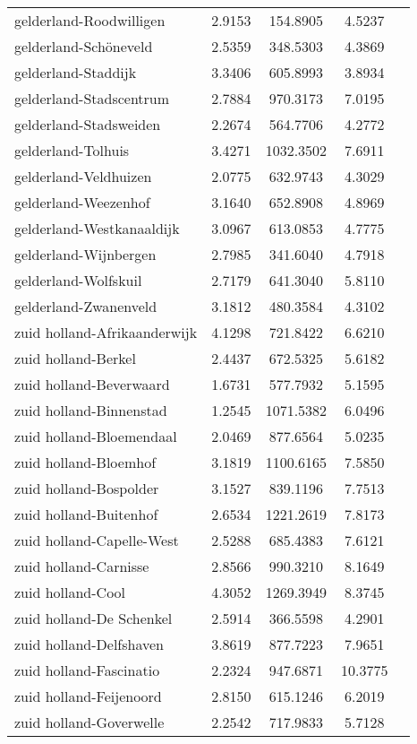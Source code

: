 \begin{longtable}{llccc}
gelderland-Roodwilligen & 2.9153 & 154.8905 & 4.5237 \\
gelderland-Schöneveld & 2.5359 & 348.5303 & 4.3869 \\
gelderland-Staddijk & 3.3406 & 605.8993 & 3.8934 \\
gelderland-Stadscentrum & 2.7884 & 970.3173 & 7.0195 \\
gelderland-Stadsweiden & 2.2674 & 564.7706 & 4.2772 \\
gelderland-Tolhuis & 3.4271 & 1032.3502 & 7.6911 \\
gelderland-Veldhuizen & 2.0775 & 632.9743 & 4.3029 \\
gelderland-Weezenhof & 3.1640 & 652.8908 & 4.8969 \\
gelderland-Westkanaaldijk & 3.0967 & 613.0853 & 4.7775 \\
gelderland-Wijnbergen & 2.7985 & 341.6040 & 4.7918 \\
gelderland-Wolfskuil & 2.7179 & 641.3040 & 5.8110 \\
gelderland-Zwanenveld & 3.1812 & 480.3584 & 4.3102 \\
zuid holland-Afrikaanderwijk & 4.1298 & 721.8422 & 6.6210 \\
zuid holland-Berkel & 2.4437 & 672.5325 & 5.6182 \\
zuid holland-Beverwaard & 1.6731 & 577.7932 & 5.1595 \\
zuid holland-Binnenstad & 1.2545 & 1071.5382 & 6.0496 \\
zuid holland-Bloemendaal & 2.0469 & 877.6564 & 5.0235 \\
zuid holland-Bloemhof & 3.1819 & 1100.6165 & 7.5850 \\
zuid holland-Bospolder & 3.1527 & 839.1196 & 7.7513 \\
zuid holland-Buitenhof & 2.6534 & 1221.2619 & 7.8173 \\
zuid holland-Capelle-West & 2.5288 & 685.4383 & 7.6121 \\
zuid holland-Carnisse & 2.8566 & 990.3210 & 8.1649 \\
zuid holland-Cool & 4.3052 & 1269.3949 & 8.3745 \\
zuid holland-De Schenkel & 2.5914 & 366.5598 & 4.2901 \\
zuid holland-Delfshaven & 3.8619 & 877.7223 & 7.9651 \\
zuid holland-Fascinatio & 2.2324 & 947.6871 & 10.3775 \\
zuid holland-Feijenoord & 2.8150 & 615.1246 & 6.2019 \\
zuid holland-Goverwelle & 2.2542 & 717.9833 & 5.7128 \\

\end{longtable}
